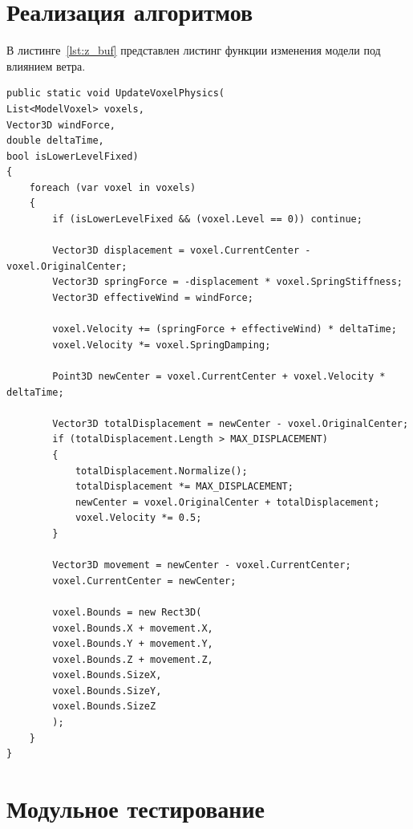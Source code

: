 \section{Реализация алгоритмов}

В листинге~\ref{lst:z_buf} представлен листинг функции изменения модели под влиянием ветра.
\newpage
\begin{lstlisting}[style=C, caption={},label={lst:z_buf}]
public static void UpdateVoxelPhysics(
List<ModelVoxel> voxels,
Vector3D windForce,
double deltaTime,
bool isLowerLevelFixed)
{
	foreach (var voxel in voxels)
	{
		if (isLowerLevelFixed && (voxel.Level == 0)) continue;
		
		Vector3D displacement = voxel.CurrentCenter - voxel.OriginalCenter;
		Vector3D springForce = -displacement * voxel.SpringStiffness;
		Vector3D effectiveWind = windForce;
		
		voxel.Velocity += (springForce + effectiveWind) * deltaTime;
		voxel.Velocity *= voxel.SpringDamping;
		
		Point3D newCenter = voxel.CurrentCenter + voxel.Velocity * deltaTime;
		
		Vector3D totalDisplacement = newCenter - voxel.OriginalCenter;
		if (totalDisplacement.Length > MAX_DISPLACEMENT)
		{
			totalDisplacement.Normalize();
			totalDisplacement *= MAX_DISPLACEMENT;
			newCenter = voxel.OriginalCenter + totalDisplacement;
			voxel.Velocity *= 0.5; 
		}
		
		Vector3D movement = newCenter - voxel.CurrentCenter;
		voxel.CurrentCenter = newCenter;
		
		voxel.Bounds = new Rect3D(
		voxel.Bounds.X + movement.X,
		voxel.Bounds.Y + movement.Y,
		voxel.Bounds.Z + movement.Z,
		voxel.Bounds.SizeX,
		voxel.Bounds.SizeY,
		voxel.Bounds.SizeZ
		);
	}
}
\end{lstlisting}

\section{Модульное тестирование}


